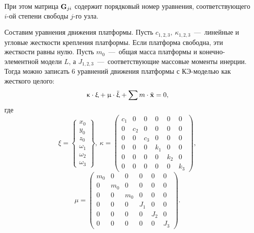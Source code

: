 При этом матрица $ \mathbf{G}_{ji} $ содержит порядковый номер уравнения, соответствующего $ i $-ой степени свободы $ j $-го узла.

Составим уравнения движения платформы. Пусть $ c_{1,2,3}, \ \kappa_{1,2,3} $~---~линейные и угловые жесткости крепления платформы. Если платформа свободна, эти жесткости равны нулю. Пусть $ m_0 $~---~общая масса платформы и конечно-элементной модели $ L $, а  $ J_{1,2,3} $~---~соответствующие массовые моменты инерции. Тогда можно записать 6 уравнений движения платформы с КЭ-моделью как жесткого целого:
\begin{equation}
	\upkappa \cdot \upxi + \upmu \cdot \ddot{\upxi} + \sum m \cdot \ddot{\mathbf{x}} = 0,
	\label{eq:motionPlatform}
\end{equation}
где
\begin{equation}
	\xi =
	\begin{Bmatrix}
		x_0 \\ y_0 \\ z_0 \\ \omega_1 \\ \omega_2 \\ \omega_3
	\end{Bmatrix}, \
	\kappa =
	\begin{pmatrix}
		c_1 & 0 & 0 & 0 & 0 & 0 \\
		0 & c_2 & 0 & 0 & 0 & 0 \\
		0 & 0 & c_3 & 0 & 0 & 0 \\
		0 & 0 & 0 & k_1 & 0 & 0 \\
		0 & 0 & 0 & 0 & k_2 & 0 \\
		0 & 0 & 0 & 0 & 0 & k_3
	\end{pmatrix},
\end{equation}
\begin{equation}
	\mu =
	\begin{pmatrix}
		m_0 & 0 & 0 & 0 & 0 & 0 \\
		0 & m_0 & 0 & 0 & 0 & 0 \\
		0 & 0 & m_0 & 0 & 0 & 0 \\
		0 & 0 & 0 & J_1 & 0 & 0 \\
		0 & 0 & 0 & 0 & J_2 & 0 \\
		0 & 0 & 0 & 0 & 0 & J_3
	\end{pmatrix}.
\end{equation}


